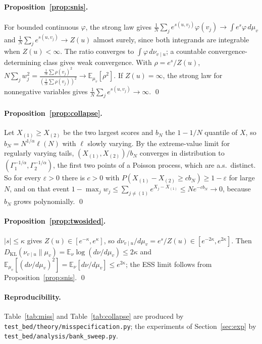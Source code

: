 \documentclass[11pt]{article}
\newcommand{\KL}{D_{\mathrm{KL}}}
\newcommand{\E}{\mathbb{E}}
\newcommand{\vu}{{v\mid u}}
\theoremstyle{plain}
\theoremstyle{definition}
\theoremstyle{remark}
\begin{document}
\paragraph{Proposition~\ref{prop:snis}.} For bounded continuous $\varphi$, the strong law gives
$\frac1N\sum_j e^{s(u,v_j)}\varphi(v_j)\to\int e^{s}\varphi\,d\mu_v$ and $\frac1N\sum_je^{s(u,v_j)}\to Z(u)$ almost
surely, since both integrands are integrable when $Z(u)<\infty$. The ratio converges to
$\int\varphi\,d\nu_\vu$; a countable convergence-determining class gives weak convergence. With
$\rho=e^{s}/Z(u)$, $N\sum_jw_j^2=\frac{\frac1N\sum\rho(v_j)^2}{(\frac1N\sum\rho(v_j))^2}\to\E_{\mu_v}[\rho^2]$. If
$Z(u)=\infty$, the strong law for nonnegative variables gives $\frac1N\sum_je^{s(u,v_j)}\to\infty$. \qed

\paragraph{Proposition~\ref{prop:collapse}.} Let $X_{(1)}\ge X_{(2)}$ be the two largest scores and
$b_N$ the $1-1/N$ quantile of $X$, so $b_N=N^{1/\alpha}\ell(N)$ with $\ell$ slowly varying. By the
extreme-value limit for regularly varying tails, $(X_{(1)},X_{(2)})/b_N$ converges in distribution
to $(\Gamma_1^{-1/\alpha},\Gamma_2^{-1/\alpha})$, the first two points of a Poisson process, which are a.s.\
distinct. So for every $\varepsilon>0$ there is $c>0$ with $P(X_{(1)}-X_{(2)}\ge cb_N)\ge1-\varepsilon$ for
large $N$, and on that event $1-\max_jw_j\le\sum_{j\ne(1)}e^{X_j-X_{(1)}}\le Ne^{-cb_N}\to0$, because
$b_N$ grows polynomially. \qed

\paragraph{Proposition~\ref{prop:twosided}.} $|s|\le\kappa$ gives $Z(u)\in[e^{-\kappa},e^\kappa]$, so
$d\nu_\vu/d\mu_v=e^{s}/Z(u)\in[e^{-2\kappa},e^{2\kappa}]$. Then $\KL(\nu_\vu\|\mu_v)=\E_\nu\log(d\nu/d\mu_v)\le2\kappa$ and
$\E_{\mu_v}[(d\nu/d\mu_v)^2]=\E_\nu[d\nu/d\mu_v]\le e^{2\kappa}$; the ESS limit follows from
Proposition~\ref{prop:snis}. \qed

\paragraph{Reproducibility.} Table~\ref{tab:miss} and Table~\ref{tab:collapse} are produced by
\texttt{test\_bed/theory/misspecification.py}; the experiments of Section~\ref{sec:exp} by
\texttt{test\_bed/analysis/bank\_sweep.py}.
\end{document}
